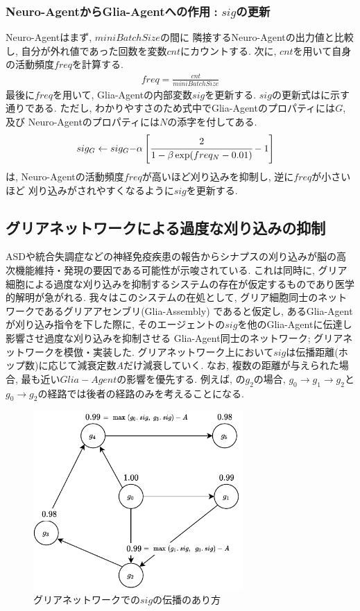 \documentclass[a4paper, 9pt,twocolumn,dvipdfmx]{jsarticle}
\begin{document}
\subsubsection*{Neuro-AgentからGlia-Agentへの作用\,\,:\,\,$sig$の更新}
Neuro-Agentはまず, $miniBatchSize$の間に
隣接するNeuro-Agentの出力値と比較し, 自分が外れ値であった回数を変数$cnt$にカウントする.
次に, $cnt$を用いて自身の活動頻度$freq$を計算する.
\begin{align}
  freq=\displaystyle\frac{cnt}{miniBatchSize}
\end{align}
最後に$freq$を用いて, Glia-Agentの内部変数$sig$を更新する.
$sig$の更新式はに示す通りである. 
ただし, わかりやすさのため式中でGlia-Agentのプロパティには$G$, 及び
Neuro-Agentのプロパティには$N$の添字を付してある.
\begin{align}
  sig_G\leftarrow sig_G-&\alpha\left[\cfrac{2}{1-\beta\exp(freq_N-0.01)}-1\right]
  \label{eq:sig}
\end{align}
は, Neuro-Agentの活動頻度$freq$が高いほど刈り込みを抑制し, 逆に$freq$が小さいほど
刈り込みがされやすくなるように$sig$を更新する.
\subsection{グリアネットワークによる過度な刈り込みの抑制}
ASDや統合失調症などの神経免疫疾患の報告からシナプスの刈り込みが脳の高次機能維持・発現の要因である可能性が示唆されている.
これは同時に, グリア細胞による過度な刈り込みを抑制するシステムの存在が仮定するものであり医学的解明が急がれる.
我々はこのシステムの在処として, グリア細胞同士のネットワークであるグリアアセンブリ(Glia-Assembly)
であると仮定し, あるGlia-Agentが刈り込み指令を下した際に, 
そのエージェントの$sig$を他のGlia-Agentに伝達し影響させ過度な刈り込みを抑制させる
Glia-Agent同士のネットワーク; グリアネットワークを模倣・実装した.
グリアネットワーク上において$sig$は伝播距離(ホップ数)に応じて減衰定数$A$だけ減衰していく.
なお, 複数の距離が与えられた場合, 最も近い$Glia-Agent$の影響を優先する.
例えば, の$g_2$の場合, 
$g_0\rightarrow g_1\rightarrow g_2$と$g_0\rightarrow g_2$の経路では後者の経路のみを考えることになる.
\vspace{-5mm}
\begin{figure}[H]
  \centering
  \includegraphics[width=8cm]{GliaNetworks.pdf}
  \caption{グリアネットワークでの$sig$の伝播のあり方}
  \label{fig:GliaNetworks}
\end{figure}
\vspace{-4mm}
\end{document}
